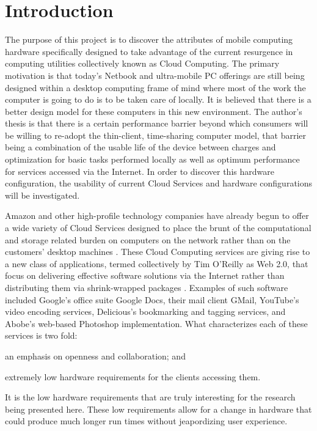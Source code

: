 \documentclass[12pt,oneside,letterpaper,titlepage]{report}
\begin{document}
\chapter{Introduction}


The purpose of this project is to discover the attributes of mobile computing
hardware specifically designed to take advantage of the current resurgence in
computing utilities collectively known as Cloud Computing.  The primary
motivation is that today's Netbook and ultra-mobile PC offerings are still being
designed within a desktop computing frame of mind where most of the work the
computer is going to do is to be taken care of locally.  It is believed that
there is a better design model for these computers in this new environment.  The
author's thesis is that there is a certain performance barrier beyond which
consumers will be willing to re-adopt the thin-client, time-sharing computer
model, that barrier being a combination of the usable life of the device between
charges and optimization for basic tasks performed locally as well as optimum
performance for services accessed via the Internet.  In order to discover this
hardware configuration, the usability of current Cloud Services and hardware
configurations will be investigated.


Amazon and other high-profile technology companies have already begun to offer a
wide variety of Cloud Services designed to place the brunt of the computational
and storage related burden on computers on the network rather than on the
customers' desktop machines \citep{reiss2008}.  These Cloud Computing services
are giving rise to a new class of applications, termed collectively by Tim
O'Reilly as Web 2.0, that focus on delivering effective software solutions via
the Internet rather than distributing them via shrink-wrapped packages
\citep{bleicher2006}.  Examples of such software included Google's office suite
Google Docs, their mail client GMail, YouTube's video encoding services,
Delicious's bookmarking and tagging services, and Abobe's web-based Photoshop
implementation.  What characterizes each of these services is two fold:
\begin{inparaenum}[(1)]
\item an emphasis on openness and collaboration; and
\item extremely low hardware requirements for the clients accessing them.
\end{inparaenum}
It is the low hardware requirements that are truly interesting for the research
being presented here.  These low requirements allow for a change in hardware
that could produce much longer run times without jeapordizing user experience.
\end{document}
